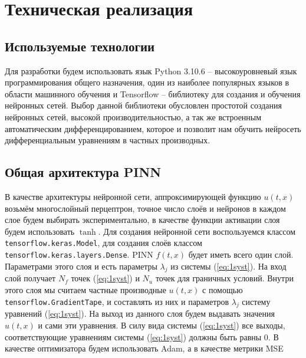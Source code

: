 \documentclass[a4paper,14pt]{extarticle} %
\begin{document}
\FloatBarrier
\newpage
\section{Техническая реализация}
\subsection{Используемые технологии}


Для разработки будем использовать язык Python 3.10.6 -- высокоуровневый язык программирования общего назначения, один из наиболее популярных языков в области машинного обучения и Tensorflow -- библиотеку для создания и обучения нейронных сетей. Выбор данной библиотеки обусловлен простотой создания нейронных сетей, высокой производительностью, а так же встроенным автоматическим дифференцированием, которое и позволит нам обучить нейросеть дифференциальным уравнениям в частных производных.

\subsection{Общая архитектура PINN}

В качестве архитектуры нейронной сети, аппроксимирующей функцию $u(t,x)$ возьмём многослойный перцептрон, точное число слоёв и нейронов в каждом слое будем выбирать экспериментально, в качестве функции активации слоя будем использовать $\tanh$. Для создания нейронной сети воспользуемся классом \texttt{tensorflow.keras.Model}, для создания слоёв классом \texttt{tensorflow.keras.layers.Dense}. PINN $f(t, x)$ будет иметь всего один слой. Параметрами этого слоя и есть параметры $\lambda_j$ из системы (\ref{eq:1syst}). На вход слой получает $N_f$ точек (\ref{eq:1syst}) и $N_u$ точек для граничных условий. Внутри этого слоя мы считаем частные производные $u(t,x)$ с помощью \texttt{tensorflow.GradientTape}, и составлять из них и параметров $\lambda_j$ систему уравнений (\ref{eq:1syst}). На выход из данного слоя будем выдавать значения $u(t,x)$ и сами эти уравнения. В силу вида системы (\ref{eq:1syst}) все выходы, соответствующие уравнениям системы (\ref{eq:1syst}) должны быть равны 0. В качестве оптимизатора будем использовать Adam, а в качестве метрики MSE

\end{document}
